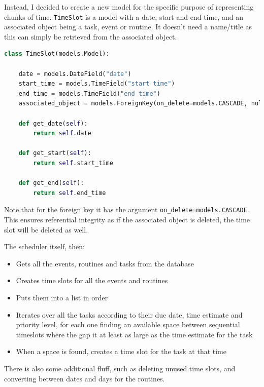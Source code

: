 \documentclass{article}
\begin{document}
Instead,
I decided to create a new model for the specific purpose of representing chunks of time.
\texttt{TimeSlot} is a model with a date, start and end time,
and an associated object being a task, event or routine.
It doesn't need a name/title as this can simply be retrieved from the associated object.

\begin{lstlisting}[language=Python, breaklines]
class TimeSlot(models.Model):

    date = models.DateField("date")
    start_time = models.TimeField("start time")
    end_time = models.TimeField("end time")
    associated_object = models.ForeignKey(on_delete=models.CASCADE, null=True)

    def get_date(self):
        return self.date

    def get_start(self):
        return self.start_time

    def get_end(self):
        return self.end_time
\end{lstlisting}

Note that for the foreign key it has the argument \texttt{on\_delete=models.CASCADE}.
This ensures referential integrity as if the associated object is deleted,
the time slot will be deleted as well.

The scheduler itself, then:
\begin{itemize}
\item Gets all the events, routines and tasks from the database
\item Creates time slots for all the events and routines
\item Puts them into a list in order
\item Iterates over all the tasks according to their due date, time estimate and priority level,
  for each one finding an available space between sequential timeslots
  where the gap it at least as large as the time estimate for the task
\item When a space is found, creates a time slot for the task at that time
\end{itemize}

There is also some additional fluff,
such as deleting unused time slots,
and converting between dates and days for the routines.
\end{document}
